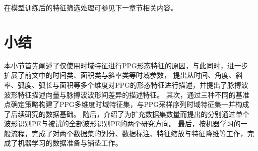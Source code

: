 在模型训练后的特征筛选处理可参见下一章节相关内容。

\section{小结}
本小节首先阐述了仅使用时域特征进行PPG形态特征的原因，与此同时，进一步扩展了前文中的时间类、面积类与斜率类等时域参数，
提出从时间、角度、斜率、弧度、弧长与面积等多个维度对PPG的形态特征进行描述，并提出了脉搏波波形特征描述向量与脉搏波波形间差异的描述特征。
其次，通过三种不同的基准点确定策略构建了PPG多维度时域特征集，与PPG采样序列时域特征集一并构成了后续研究的数据基础。
随后，介绍了为扩充数据集数量而提出的分别通过单个波形识别PE与被试的全部波形识别PE的两个研究方向。
最后，按机器学习的一般流程，完成了对两个数据集的划分、数据标注、特征缩放与特征降维等工作，完成了机器学习的数据准备与铺垫工作。